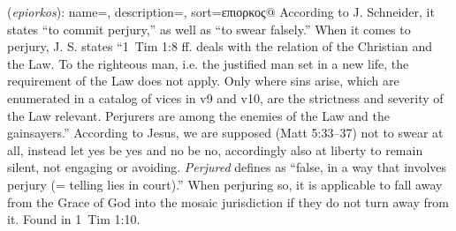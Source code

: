 \item[Perjured,]

(\textit{epiorkos}):
{
    name=,
    description={},
    sort=επιορκος@
}
According to J. Schneider, it states ``to commit perjury,'' as well as ``to swear falsely.'' When it comes to perjury, J. S. states ``1~Tim 1:8 ff. deals with the relation of the Christian and the Law. To the righteous man, i.e. the justified man set in a new life, the requirement of the Law does not apply. Only where sins arise, which are enumerated in a catalog of vices in v9 and v10, are the strictness and severity of the Law relevant. Perjurers are among the enemies of the Law and the gainsayers.'' 
According to Jesus, we are supposed (Matt 5:33--37) not to swear at all, instead let yes be yes and no be no, accordingly also at liberty to remain silent, not engaging or avoiding. \emph{Perjured} defines as ``false, in a way that involves perjury (= telling lies in court).'' When perjuring so, it is applicable to fall away from the Grace of God into the mosaic jurisdiction if they do not turn away from it.
Found in 1~Tim 1:10.
